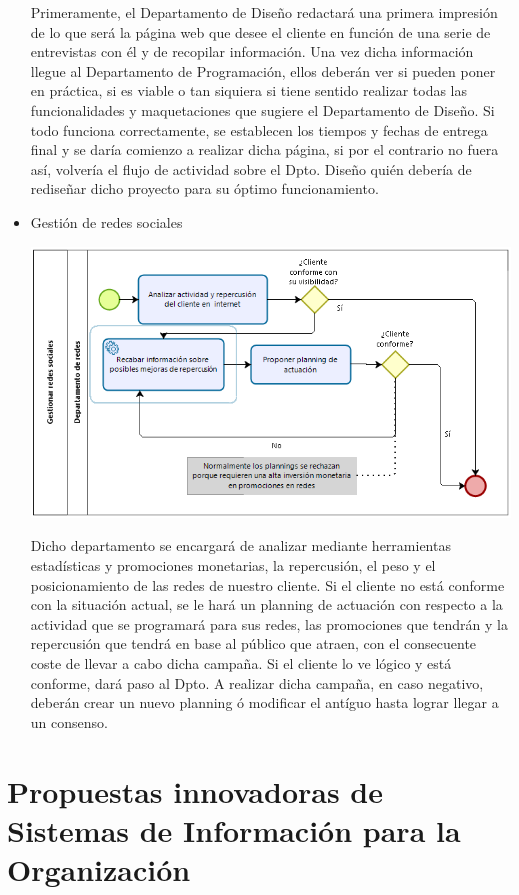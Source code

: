 \documentclass{article}
\begin{document}
\begin{itemize}
Primeramente, el Departamento de Diseño redactará una primera impresión de lo que será la página web que desee el cliente en función de una serie de entrevistas con él y de recopilar información. Una vez dicha información llegue al Departamento de Programación, ellos deberán ver si pueden poner en práctica, si es viable o tan siquiera si tiene sentido realizar todas las funcionalidades y maquetaciones que sugiere el Departamento de Diseño. Si todo funciona correctamente, se establecen los tiempos y fechas de entrega final y se daría comienzo a realizar dicha página, si por el contrario no fuera así, volvería el flujo de actividad sobre el Dpto. Diseño quién debería de rediseñar dicho proyecto para su óptimo funcionamiento.
\item Gestión de redes sociales
\begin{center}
\includegraphics[scale=0.5]{images/rrss.png}
\end{center}
Dicho departamento se encargará de analizar mediante herramientas estadísticas y
promociones monetarias, la repercusión, el peso y el posicionamiento de las redes
de nuestro cliente. Si el cliente no está conforme con la situación actual, se le hará
un planning de actuación con respecto a la actividad que se programará para sus
redes, las promociones que tendrán y la repercusión que tendrá en base al público
que atraen, con el consecuente coste de llevar a cabo dicha campaña. Si el cliente lo
ve lógico y está conforme, dará paso al Dpto. A realizar dicha campaña, en caso
negativo, deberán crear un nuevo planning ó modificar el antíguo hasta lograr llegar
a un consenso.
\end{itemize}

\section{Propuestas innovadoras de Sistemas de Información para la Organización}
\end{document}
